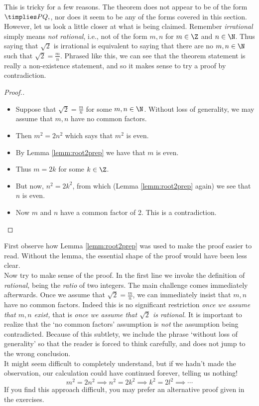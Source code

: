 \noindent This is tricky for a few reasons. The theorem does not appear to be of the form $\timplies P{Q,}$, nor does it seem to be any of the forms covered in this section. However, let us look a little closer at what is being claimed. Remember \emph{irrational} simply means \emph{not rational}, i.e., not of the form $m,n$ for $m \in \Z$ and $n \in \N$. Thus saying that $\sqrt{2}$ is irrational is equivalent to saying that there are no $m,n \in \N$ such that $\sqrt{2} = \frac{m}{n}$. Phrased like this, we can see that the theorem statement is really a non-existence statement, and so it makes sense to try a proof by contradiction.

\begin{proof}[Proof.\hspace{-27pt}]
\begin{itemize}\setlength{\itemsep}{-2pt}
  \item[] Suppose that $\sqrt 2=\frac mn$ for some $m,n\in\N$. Without loss of generality, we may assume that $m,n$ have no common factors.
  \item[] Then $m^2=2n^2$ which says that $m^2$ is even.
  \item[] By Lemma \ref{lemm:root2prep} we have that $m$ is even.
  \item[] Thus $m=2k$ for some $k\in\Z$.
	\item[] But now, $n^2=2k^2$, from which (Lemma \ref{lemm:root2prep} again) we see that $n$ is even.
	\item[] Now $m$ and $n$ have a common factor of 2. This is a contradiction.\qedhere
\end{itemize}
\end{proof}

\noindent First observe how Lemma \ref{lemm:root2prep} was used to make the proof easier to read.
Without the lemma, the essential shape of the proof would have been less clear.\\
Now try to make sense of the proof. In the first line we invoke the definition of \emph{rational,} being the \emph{ratio} of two integers. The main challenge comes immediately afterwards. Once we assume that $\sqrt 2=\frac mn$, we can immediately insist that $m,n$ have no common factors. Indeed this is no significant restriction \emph{once we assume that $m,n$ exist,} that is \emph{once we assume that $\sqrt 2$ is rational.} It is important to realize that the `no common factors' assumption is \emph{not} the assumption being contradicted. Because of this subtlety, we include the phrase `without loss of generality' so that the reader is forced to think carefully, and does not jump to the wrong conclusion.\\
It might seem difficult to completely understand, but if we hadn't made the observation, our calculation could have continued forever, telling us nothing!
\[m^2=2n^2\implies n^2=2k^2\implies k^2=2l^2\implies\cdots\]
If you find this approach difficult, you may prefer an alternative proof given in the exercises.


